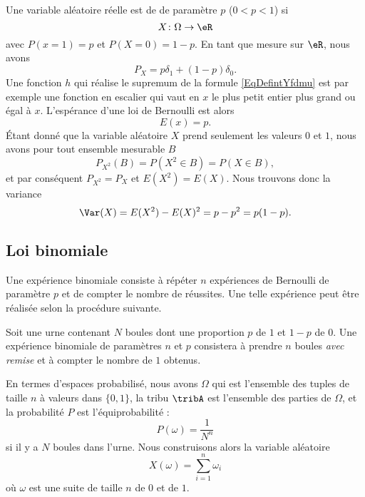 Une variable aléatoire réelle est de  de paramètre \( p\) (\( 0<p<1\)) si
\begin{equation}
    X\colon \Omega\to \eR
\end{equation}
avec \( P(x=1)=p\) et \( P(X=0)=1-p\). En tant que mesure sur \( \eR\), nous avons
\begin{equation}
    P_X=p\delta_1+(1-p)\delta_0.
\end{equation}
Une fonction \( h\) qui réalise le supremum de la formule \eqref{EqDefintYfdmu} est par exemple une fonction en escalier qui vaut en \( x\) le plus petit entier plus grand ou égal à \( x\). L'espérance d'une loi de Bernoulli est alors
\begin{equation}
    E(x)=p.
\end{equation}
Étant donné que la variable aléatoire \( X\) prend seulement les valeurs \( 0\) et \( 1\), nous avons pour tout ensemble mesurable \( B\)
\begin{equation}
    P_{X^2}(B)=P(X^2\in B)=P(X\in B),
\end{equation}
et par conséquent \( P_{X^2}=P_X\) et \( E(X^2)=E(X)\). Nous trouvons donc la variance
\begin{equation}        \label{EqVarBern}
    \Var(X)=E(X^2)-E(X)^2=p-p^2=p(1-p).
\end{equation}

\subsection{Loi binomiale}

Une expérience binomiale consiste à répéter \( n\) expériences de Bernoulli de paramètre \( p\) et de compter le nombre de réussites. Une telle expérience peut être réalisée selon la procédure suivante.

Soit une urne contenant \( N\) boules dont une proportion \( p\) de \( 1\) et \( 1-p\) de \( 0\). Une expérience binomiale de paramètres \( n\) et \( p\) consistera à prendre \( n\) boules \emph{avec remise} et à compter le nombre de \( 1\) obtenus.

En termes d'espaces probabilisé, nous avons \( \Omega\) qui est l'ensemble des tuples de taille \( n\) à valeurs dans \( \{ 0,1 \}\), la tribu \( \tribA\) est l'ensemble des parties de \( \Omega\), et la probabilité \( P\) est l'équiprobabilité :
\begin{equation}
    P(\omega)=\frac{1}{ N^n }
\end{equation}
si il y a \( N\) boules dans l'urne. Nous construisons alors la variable aléatoire
\begin{equation}
    X(\omega)=\sum_{i=1}^n\omega_i
\end{equation}
où \( \omega\) est une suite de taille \( n\) de $0$ et de \( 1\).

